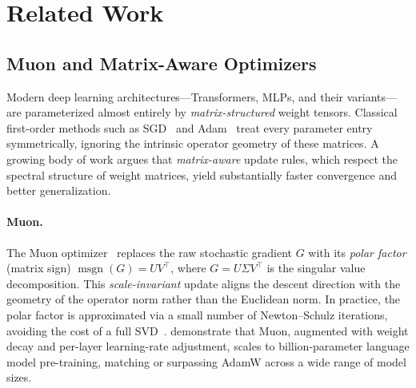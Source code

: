 
\section{Related Work}
\label{sec:related_work}

\subsection{Muon and Matrix-Aware Optimizers}
\label{subsec:muon}

Modern deep learning architectures—Transformers, MLPs, and their variants—are
parameterized almost entirely by \emph{matrix-structured} weight tensors.
Classical first-order methods such as SGD~\citep{nedic2009distributed} and
Adam~\citep{kingma2014adam} treat every parameter entry symmetrically, ignoring
the intrinsic operator geometry of these matrices.  A growing body of work
argues that \emph{matrix-aware} update rules, which respect the spectral
structure of weight matrices, yield substantially faster convergence and better
generalization.

\paragraph{Muon.}
The Muon optimizer~\citep{jordan2024muon} replaces the raw stochastic gradient
$G$ with its \emph{polar factor} (matrix sign)
$\operatorname{msgn}(G) = UV^{\top}$, where $G = U\Sigma V^{\top}$ is the
singular value decomposition.  This \emph{scale-invariant} update aligns the
descent direction with the geometry of the operator norm rather than the
Euclidean norm.  In practice, the polar factor is approximated via a small
number of Newton--Schulz iterations, avoiding the cost of a full
SVD~\citep{amsel2025polar, grishina2025chebyshev}.
\citet{liu2025muon_scalable} demonstrate that Muon, augmented with weight decay
and per-layer learning-rate adjustment, scales to billion-parameter language
model pre-training, matching or surpassing AdamW across a wide range of model
sizes.

